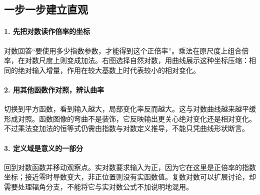 \subsection*{一步一步建立直观}

\paragraph{1. 先把对数读作倍率的坐标}

对数回答“要使用多少指数参数，才能得到这个正倍率”。乘法在原尺度上组合倍率，在对数尺度上则变成加法。右图选择自然对数，用曲线展示这种坐标压缩：相同的绝对输入增量，作用在较大基数上时代表较小的相对变化。



\paragraph{2. 用其他函数作对照，辨认曲率}

切换到平方函数，看到输入越大，局部变化率反而越大。这与对数曲线越来越平缓形成对照。函数图像的弯曲不是装饰，它反映输出更关心绝对变化还是相对变化。不过乘法变加法的恒等式仍需由指数与对数定义推导，不能只凭曲线形状断言。



\paragraph{3. 定义域是意义的一部分}

回到对数函数并移动观察点。实对数要求输入为正，因为它在这里是正倍率的指数坐标；接近零时导数变大，非正位置则没有实函数值。复数对数可以扩展讨论，却需要处理辐角分支，不能将它与实对数公式不加说明地混用。
